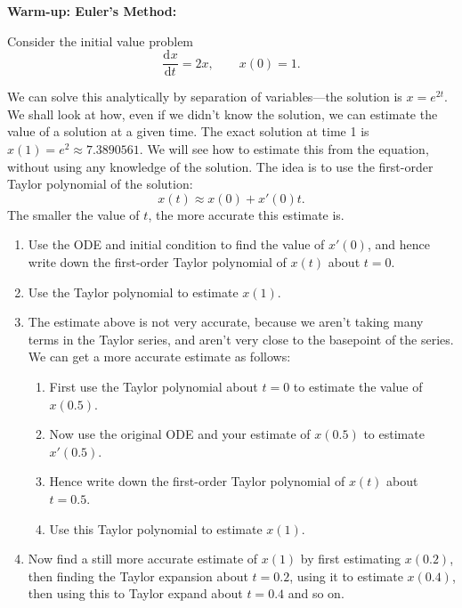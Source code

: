 \documentclass{article}
\newcommand{\deriv}[3][]{\frac{\mathrm{d}^{#1}#2}{\mathrm{d}#3^{#1}}}
\begin{document}
\clearpage









\textbf{Warm-up: Euler's Method:}\bigskip

Consider the initial value problem
\[\deriv{x}{t} = 2x,\qquad x(0)=1.\]

We can solve this analytically by separation of variables---the solution is $x=e^{2t}$. We shall look at how, even if we didn't know the solution, we can estimate the value of a solution at a given time. The exact solution at time 1 is $x(1)=e^2\approx7.3890561$. We will see how to estimate this from the equation, without using any knowledge of the solution. The idea is to use the first-order Taylor polynomial of the solution:
\[x(t)\approx x(0) + x'(0)t.\]
The smaller the value of $t$, the more accurate this estimate is.

\begin{enumerate}
	\item Use the ODE and initial condition to find the value of $x'(0)$, and hence write down the first-order Taylor polynomial of $x(t)$ about $t=0$.
	\item Use the Taylor polynomial to estimate $x(1)$.
	\item The estimate above is not very accurate, because we aren't taking many terms in the Taylor series, and aren't very close to the basepoint of the series. We can get a more accurate estimate as follows:
		\begin{enumerate}
			\item First use the Taylor polynomial about $t=0$ to estimate the value of $x(0.5)$.
			\item Now use the original ODE and your estimate of $x(0.5)$ to estimate $x'(0.5)$.
			\item Hence write down the first-order Taylor polynomial of $x(t)$ about $t=0.5$.
			\item Use this Taylor polynomial to estimate $x(1)$.
		\end{enumerate}
	\item Now find a still more accurate estimate of $x(1)$ by first estimating $x(0.2)$, then finding the Taylor expansion about $t=0.2$, using it to estimate $x(0.4)$, then using this to Taylor expand about $t=0.4$ and so on.
\end{enumerate}
\end{document}

